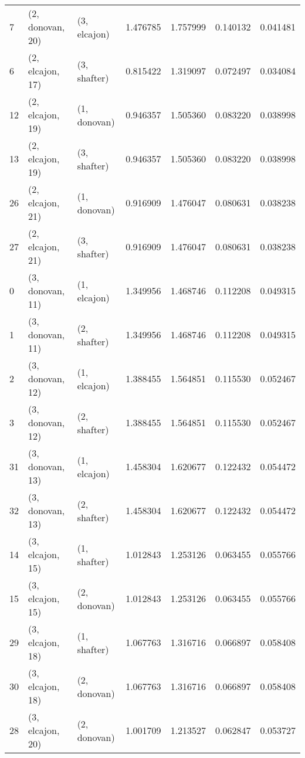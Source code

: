 \begin{tabular}{lllrrrr}
7  &  (2, donovan, 20) &     (3, elcajon) &  1.476785 &  1.757999 &   0.140132 &  0.041481 \\
6  &  (2, elcajon, 17) &     (3, shafter) &  0.815422 &  1.319097 &   0.072497 &  0.034084 \\
12 &  (2, elcajon, 19) &     (1, donovan) &  0.946357 &  1.505360 &   0.083220 &  0.038998 \\
13 &  (2, elcajon, 19) &     (3, shafter) &  0.946357 &  1.505360 &   0.083220 &  0.038998 \\
26 &  (2, elcajon, 21) &     (1, donovan) &  0.916909 &  1.476047 &   0.080631 &  0.038238 \\
27 &  (2, elcajon, 21) &     (3, shafter) &  0.916909 &  1.476047 &   0.080631 &  0.038238 \\
0  &  (3, donovan, 11) &     (1, elcajon) &  1.349956 &  1.468746 &   0.112208 &  0.049315 \\
1  &  (3, donovan, 11) &     (2, shafter) &  1.349956 &  1.468746 &   0.112208 &  0.049315 \\
2  &  (3, donovan, 12) &     (1, elcajon) &  1.388455 &  1.564851 &   0.115530 &  0.052467 \\
3  &  (3, donovan, 12) &     (2, shafter) &  1.388455 &  1.564851 &   0.115530 &  0.052467 \\
31 &  (3, donovan, 13) &     (1, elcajon) &  1.458304 &  1.620677 &   0.122432 &  0.054472 \\
32 &  (3, donovan, 13) &     (2, shafter) &  1.458304 &  1.620677 &   0.122432 &  0.054472 \\
14 &  (3, elcajon, 15) &     (1, shafter) &  1.012843 &  1.253126 &   0.063455 &  0.055766 \\
15 &  (3, elcajon, 15) &     (2, donovan) &  1.012843 &  1.253126 &   0.063455 &  0.055766 \\
29 &  (3, elcajon, 18) &     (1, shafter) &  1.067763 &  1.316716 &   0.066897 &  0.058408 \\
30 &  (3, elcajon, 18) &     (2, donovan) &  1.067763 &  1.316716 &   0.066897 &  0.058408 \\
28 &  (3, elcajon, 20) &     (2, donovan) &  1.001709 &  1.213527 &   0.062847 &  0.053727 \\
\bottomrule
\end{tabular}
